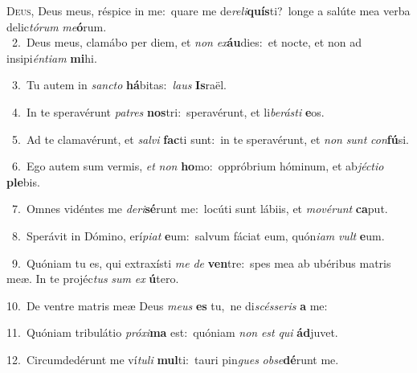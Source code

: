 \lettrine{\initial\textcolor{\initialcolor}{D}}{eus,} Deus meus, réspice in me:~\dagger quare me de\-\textit{re}\-\textit{li}\textbf{quís}ti?~\star longe a salúte mea verba delic\-\textit{tó}\-\textit{rum} \textit{me}\-\textbf{ó}rum.\\
{\numbfont\textcolor{\numbcolor}{~2.}}~Deus meus, clamábo per diem, et \textit{non} \textit{ex}\-\textbf{áu}dies:~\star et nocte, et non ad insipi\-\textit{én}\-\textit{ti}\textit{am} \textbf{mi}\-hi.\par
{\numbfont\textcolor{\numbcolor}{~3.}}~Tu autem in \textit{sanc}\-\textit{to} \textbf{há}\-bitas:~\star \textit{laus} \textbf{Is}\-raël.\par
{\numbfont\textcolor{\numbcolor}{~4.}}~In te speravérunt \textit{pa}\-\textit{tres} \textbf{nos}\-tri:~\star speravérunt, et li\-\textit{be}\-\textit{rás}\textit{ti} \textbf{e}\-os.\par
{\numbfont\textcolor{\numbcolor}{~5.}}~Ad te clamavérunt, et \textit{sal}\-\textit{vi} \textbf{fac}\-ti sunt:~\star in te speravérunt, et \textit{non} \textit{sunt} \textit{con}\-\textbf{fú}si.\par
{\numbfont\textcolor{\numbcolor}{~6.}}~Ego autem sum vermis, \textit{et} \textit{non} \textbf{ho}\-mo:~\star oppróbrium hóminum, et ab\-\textit{jéc}\-\textit{ti}\textit{o} \textbf{ple}\-bis.\par
{\numbfont\textcolor{\numbcolor}{~7.}}~Omnes vidéntes me \textit{de}\-\textit{ri}\textbf{sé}runt me:~\star locúti sunt lábiis, et \textit{mo}\-\textit{vé}\textit{runt} \textbf{ca}\-put.\par
{\numbfont\textcolor{\numbcolor}{~8.}}~Sperávit in Dómino, erí\-\textit{pi}\-\textit{at} \textbf{e}\-um:~\star salvum fáciat eum, quón\-\textit{i}\-\textit{am} \textit{vult} \textbf{e}\-um.\par
{\numbfont\textcolor{\numbcolor}{~9.}}~Quóniam tu es, qui extraxísti \textit{me} \textit{de} \textbf{ven}\-tre:~\star spes mea ab ubéribus matris meæ. In te projéc\textit{tus} \textit{sum} \textit{ex} \textbf{ú}\-tero.\par
{\numbfont\textcolor{\numbcolor}{10.}}~De ventre matris meæ Deus \textit{me}\-\textit{us} \textbf{es} tu,~\star ne di\-\textit{scés}\-\textit{se}\textit{ris} \textbf{a} me:\par
{\numbfont\textcolor{\numbcolor}{11.}}~Quóniam tribulátio \textit{pró}\-\textit{xi}\textbf{ma} est:~\star quóniam \textit{non} \textit{est} \textit{qui} \textbf{ád}\-juvet.\par
{\numbfont\textcolor{\numbcolor}{12.}}~Circumdedérunt me ví\-\textit{tu}\-\textit{li} \textbf{mul}\-ti:~\star tauri pin\textit{gues} \textit{ob}\-\textit{se}\textbf{dé}runt me.\par
